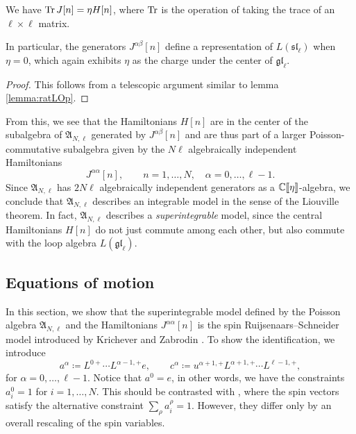 \begin{lemma}
    We have $\operatorname{Tr} J[n] = \eta H[n]$, where $\operatorname{Tr}$ is the operation of taking the trace of an $\ell \times \ell$ matrix.
\end{lemma}

\begin{remark}
    In particular, the generators $J^{\alpha\beta}[n]$ define a representation of $L(\mathfrak{sl}_\ell)$ when $\eta = 0$, which again exhibits $\eta$ as the charge under the center of $\mathfrak{gl}_\ell$.
\end{remark}

\begin{proof}
    This follows from a telescopic argument similar to lemma \ref{lemma:ratLOp}.
\end{proof}

From this, we see that the Hamiltonians $H[n]$ are in the center of the subalgebra of $\mathfrak{A}_{N,\ell}$ generated by $J^{\alpha\beta}[n]$ and are thus part of a larger Poisson-commutative subalgebra given by the $N\ell$ algebraically independent Hamiltonians
\begin{equation}
    J^{\alpha\alpha}[n], \qquad n=1,\dots,N, \quad \alpha=0,\dots,\ell-1.
\end{equation}
Since $\mathfrak{A}_{N,\ell}$ has $2N\ell$ algebraically independent generators as a $\mathbb{C}\llbracket \eta \rrbracket$-algebra, we conclude that $\mathfrak{A}_{N,\ell}$ describes an integrable model in the sense of the Liouville theorem. In fact, $\mathfrak{A}_{N,\ell}$ describes a \emph{superintegrable} model, since the central Hamiltonians $H[n]$ do not just commute among each other, but also commute with the loop algebra $L(\mathfrak{gl}_\ell)$.

\subsection{Equations of motion}

In this section, we show that the superintegrable model defined by the Poisson algebra $\mathfrak{A}_{N,\ell}$ and the Hamiltonians $J^{\alpha\alpha}[n]$ is the spin Ruijsenaars--Schneider model introduced by Krichever and Zabrodin \cite{krichever_spin_1995}. To show the identification, we introduce
\begin{equation}
    a^\alpha \coloneq L^{0+} \cdots L^{\alpha-1,+} e, \qquad c^\alpha \coloneq u^{\alpha+1,+} L^{\alpha+1,+} \cdots L^{\ell-1,+},
\end{equation}
for $\alpha=0,\dots,\ell-1$. Notice that $a^0 = e$, in other words, we have the constraints $a_i^0 = 1$ for $i=1,\dots,N$. This should be contrasted with \cite{arutyunov_hamiltonian_1998,chalykh_hamiltonian_2020,arutyunov_hyperbolic_2019,fairon_compatible_2026}, where the spin vectors satisfy the alternative constraint $\sum_\rho a_i^\rho = 1$. However, they differ only by an overall rescaling of the spin variables.

